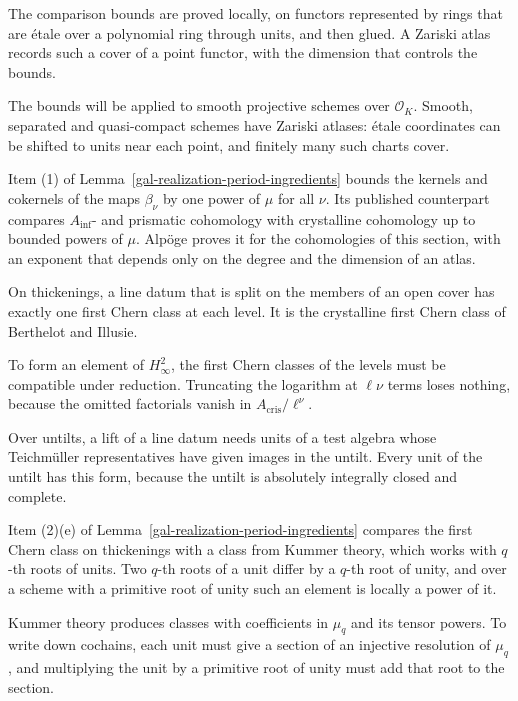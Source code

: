 The comparison bounds are proved locally, on functors represented by rings that are \'etale over a polynomial ring
through units, and then glued. A Zariski atlas records such a cover of a point functor, with the dimension that
controls the bounds.

The bounds will be applied to smooth projective schemes over $\mathcal O_K$. Smooth, separated and quasi-compact
schemes have Zariski atlases: \'etale coordinates can be shifted to units near each point, and finitely many such charts
cover.

Item (1) of Lemma~\ref{gal-realization-period-ingredients} bounds the kernels and cokernels of the maps
$\beta_\nu$ by one power of $\mu$ for all $\nu$. Its published counterpart compares $A_{\mathrm{inf}}$- and prismatic
cohomology with crystalline cohomology up to bounded powers of $\mu$. Alpöge proves it for the cohomologies of this
section, with an exponent that depends only on the degree and the dimension of an atlas.

On thickenings, a line datum that is split on the members of an open cover has exactly one first Chern class at
each level. It is the crystalline first Chern class of Berthelot and Illusie.

To form an element of $H^2_\infty$, the first Chern classes of the levels must be compatible under reduction.
Truncating the logarithm at $\ell\nu$ terms loses nothing, because the omitted factorials vanish in
$A_{\mathrm{cris}}/\ell^\nu$.

Over untilts, a lift of a line datum needs units of a test algebra whose Teichm\"uller representatives have
given images in the untilt. Every unit of the untilt has this form, because the untilt is absolutely integrally
closed and complete.

Item (2)(e) of Lemma~\ref{gal-realization-period-ingredients} compares the first Chern class on thickenings with a
class from Kummer theory, which works with $q$-th roots of units. Two $q$-th roots of a unit differ by a $q$-th root
of unity, and over a scheme with a primitive root of unity such an element is locally a power of it.

Kummer theory produces classes with coefficients in $\mu_q$ and its tensor powers. To write down cochains, each unit
must give a section of an injective resolution of $\mu_q$, and multiplying the unit by a primitive root of unity must
add that root to the section.

